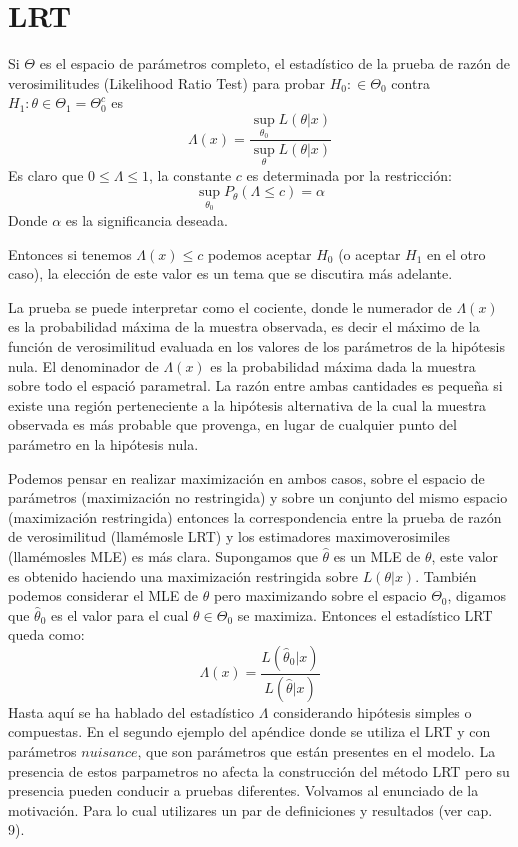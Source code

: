 \documentclass[peerreview]{IEEEtran}
\begin{document}
\section{LRT}
Si $\Theta$ es el espacio de parámetros completo, el estadístico de la prueba de razón de verosimilitudes (Likelihood Ratio Test) para probar $H_0 : \in \Theta_0$ contra $H_1: \theta \in \Theta_1 = \Theta_0^c$ es 
\begin{equation}\label{1}
\Lambda(x) = \frac{ \sup_{\theta_0} L(\theta | x)}{\sup_{\theta} L(\theta | x)}
\end{equation}
Es claro que $0 \leq \Lambda \leq 1$, la constante $c$ es determinada por la restricción: 
\[
\sup_{\theta_0} P_\theta ( \Lambda \leq c) = \alpha
\]
Donde $\alpha$ es la significancia deseada.

Entonces si tenemos $\Lambda(x) \leq c$ podemos aceptar $H_0$ (o aceptar $H_1$ en el otro caso), la elección de este valor es un tema que se discutira más adelante.

La prueba se puede interpretar como el cociente, donde le numerador de $\Lambda(x)$ es la probabilidad máxima de la muestra observada, es decir el máximo de la función de verosimilitud evaluada en los valores de los parámetros de la hipótesis nula. El denominador de $\Lambda(x)$ es la probabilidad máxima dada la muestra sobre todo el espació parametral. La razón entre ambas cantidades es pequeña si existe una región perteneciente a la hipótesis alternativa de la cual la muestra observada es más probable que provenga, en lugar de cualquier punto del parámetro en la hipótesis nula.

Podemos pensar en realizar maximización en ambos casos, sobre el espacio de parámetros (maximización no restringida) y sobre un conjunto del mismo espacio (maximización restringida) entonces la correspondencia entre la prueba de razón de verosimilitud (llamémosle LRT) y los estimadores maximoverosimiles (llamémosles MLE)  es más clara. Supongamos que $\hat{\theta}$ es un MLE de $\theta$, este valor es obtenido haciendo una maximización restringida sobre $L(\theta|x)$. También podemos considerar el MLE de $\theta$ pero maximizando sobre el espacio $\Theta_0$, digamos que $\hat{\theta}_0$ es el valor para el cual $\theta \in \Theta_0$ se maximiza. Entonces el estadístico LRT queda como:
\[
\Lambda(x) = \frac{L(\hat{\theta}_0|x)}{L(\hat{\theta}|x)}
\]
Hasta aquí se ha hablado del estadístico $\Lambda$ considerando hipótesis simples o compuestas. 
En el segundo ejemplo del apéndice donde se utiliza el LRT y con parámetros $nuisance$, que son parámetros que están presentes en el modelo. La presencia de estos parpametros no afecta la construcción del método LRT pero su presencia pueden conducir a pruebas diferentes.
Volvamos al enunciado de la motivación. Para lo cual utilizares un par de definiciones y resultados (ver \cite{Rohatgi} cap. 9). 
\end{document}
